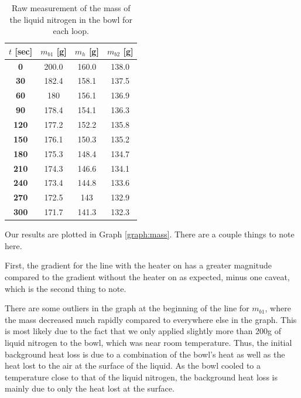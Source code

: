 \documentclass{article}
\begin{document}
\begin{table}[H]
\begin{tabular}{|c|c|c|c|}
\hline
\textbf{$t$ [sec]} & \textbf{$m_{b1}$ [g]} & \textbf{$m_h$ [g]} & \textbf{$m_{b2}$ [g]} \\ \hline
\textbf{0}              & 200.0                  & 160.0                 & 138.0                  \\ \hline
\textbf{30}             & 182.4                  & 158.1                 & 137.5                  \\ \hline
\textbf{60}             & 180                    & 156.1                 & 136.9                  \\ \hline
\textbf{90}             & 178.4                  & 154.1                 & 136.3                  \\ \hline
\textbf{120}            & 177.2                  & 152.2                 & 135.8                  \\ \hline
\textbf{150}            & 176.1                  & 150.3                 & 135.2                  \\ \hline
\textbf{180}            & 175.3                  & 148.4                 & 134.7                  \\ \hline
\textbf{210}            & 174.3                  & 146.6                 & 134.1                  \\ \hline
\textbf{240}            & 173.4                  & 144.8                 & 133.6                  \\ \hline
\textbf{270}            & 172.5                  & 143                   & 132.9                  \\ \hline
\textbf{300}            & 171.7                  & 141.3                 & 132.3                  \\ \hline
\end{tabular}
\caption{Raw measurement of the mass of the liquid nitrogen in the bowl for each loop.}
\label{tb:raw}
\end{table}

Our results are plotted in Graph \ref{graph:mass}. There are a couple things to note here.

First, the gradient for the line with the heater on has a greater magnitude compared to the gradient without the heater on as expected, minus one caveat, which is the second thing to note.

There are some outliers in the graph at the beginning of the line for $m_{b1}$, where the mass decreased much rapidly compared to everywhere else in the graph. This is most likely due to the fact that we only applied slightly more than 200g of liquid nitrogen to the bowl, which was near room temperature. Thus, the initial background heat loss is due to a combination of the bowl's heat as well as the heat lost to the air at the surface of the liquid. As the bowl cooled to a temperature close to that of the liquid nitrogen, the background heat loss is mainly due to only the heat lost at the surface.
\end{document}
